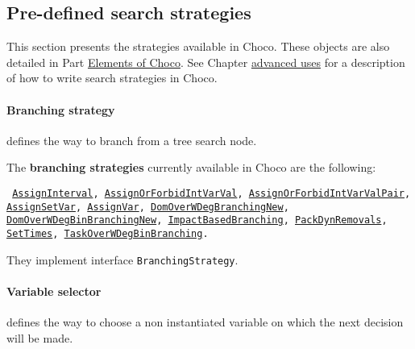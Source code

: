 \subsection{Pre-defined search strategies}\label{solver:predefinedsearchstrategy}\hypertarget{solver:predefinedsearchstrategy}{}

This section presents the strategies available in Choco. These objects are also detailed in Part \hyperlink{part:elements}{Elements of Choco}.
See Chapter \hyperlink{advanced}{advanced uses} for a description of how to write search strategies in Choco.

\paragraph{Branching strategy}\label{solver:branchstrat}\hypertarget{solver:branchstrat}{}
defines the way to branch from a tree search node.
  
\noindent The \textbf{branching strategies} currently available in Choco are the following: 
\begin{notedef}\tt
\hyperlink{assigninterval:assignintervalbranchstrat}{AssignInterval}, \hyperlink{assignorforbidintvarval:assignorforbidintvarvalbranchstrat}{AssignOrForbidIntVarVal}, \hyperlink{assignorforbidintvarvalpair:assignorforbidintvarvalpairbranchstrat}{AssignOrForbidIntVarValPair}, \hyperlink{assignsetvar:assignsetvarbranchstrat}{AssignSetVar}, \hyperlink{assignvar:assignvarbranchstrat}{AssignVar}, \hyperlink{domoverwdeg:domoverwdegbranchstrat}{DomOverWDegBranchingNew}, \hyperlink{domoverwdegbin:domoverwdegbinbranchstrat}{DomOverWDegBinBranchingNew}, \hyperlink{impact:impactbranchstrat}{ImpactBasedBranching}, \hyperlink{packdynremovals:packdynremovalsbranchstrat}{PackDynRemovals}, \hyperlink{settimes:settimesbranchstrat}{SetTimes}, \hyperlink{taskdomoverwdeg:taskdomoverwdegbranchstrat}{TaskOverWDegBinBranching}.
\end{notedef} 
They implement interface \texttt{BranchingStrategy}.   


\paragraph{Variable selector}\label{solver:variableselector}\hypertarget{solver:variableselector}{}
defines the way to choose a non instantiated variable on which the next decision will be made.


